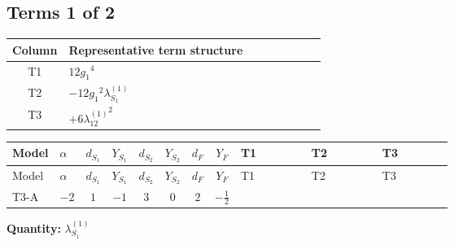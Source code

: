 \documentclass[8pt]{article}
\begin{document}
\begin{landscape}
\subsection*{Terms 1 of 2}
\begin{center}
\begin{tabular}{@{}c >{\raggedright\arraybackslash}p{0.82\linewidth}@{}}
\toprule
Column & Representative term structure \\
\midrule
T1 & \(\displaystyle 12 {g_1}^4\) \\
\midrule
T2 & \(\displaystyle -12 {g_1}^2 {\lambda_{S_1}^{(1)}}\) \\
\midrule
T3 & \(\displaystyle +6 {\lambda_{12}^{(1)}}^2\) \\
\midrule
\bottomrule
\end{tabular}
\end{center}
\smallskip
\tiny
\begin{longtable}{@{}llcccccc >{\raggedright\arraybackslash}p{0.21\linewidth} >{\raggedright\arraybackslash}p{0.21\linewidth} >{\raggedright\arraybackslash}p{0.21\linewidth}@{}}
\toprule
Model & $\alpha$ & $d_{S_1}$ & $Y_{S_1}$ & $d_{S_2}$ & $Y_{S_2}$ & $d_F$ & $Y_F$ & T1 & T2 & T3 \\
\midrule
\endfirsthead
\toprule
Model & $\alpha$ & $d_{S_1}$ & $Y_{S_1}$ & $d_{S_2}$ & $Y_{S_2}$ & $d_F$ & $Y_F$ & T1 & T2 & T3 \\
\midrule
\endhead
T3-A & $-2$ & $1$ & $-1$ & $3$ & $0$ & $2$ & $-\frac{1}{2}$ & \scriptsize\adjustbox{max width=\linewidth}{$\begin{gathered} 12 {g_1}^4\end{gathered}$} & \scriptsize\adjustbox{max width=\linewidth}{$\begin{gathered} -12 {g_1}^2 {\lambda_{S_1}^{(1)}}\end{gathered}$} & \scriptsize\adjustbox{max width=\linewidth}{$\begin{gathered} +6 {\lambda_{12}^{(1)}}^2\end{gathered}$} \\
\midrule
\bottomrule
\end{longtable}
\clearpage
\noindent\textbf{Quantity: }$\lambda_{S_1}^{(1)}$\par\smallskip

\end{landscape}
\end{document}
